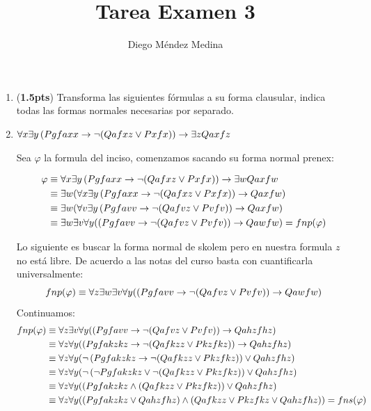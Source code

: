 \documentclass[11pt,letterpaper]{article}
\title{Tarea Examen 3}
\author{Diego Méndez Medina}
\date{}
\begin{document}
\maketitle

\thispagestyle{empty}


\begin{enumerate}
\item ({\bf 1.5pts}) Transforma las siguientes fórmulas a su forma clausular, indica todas las formas normales necesarias por separado.

  \be
\item $\forall x\exists y\left(Pgfaxx \to \neg (Qafxz \lor Pxfx) \right) \to \exists z Qaxfz$

  Sea $\varphi$ la formula del inciso,
  comenzamos sacando su forma normal prenex:
  
  \begin{align*}
    \varphi 
    &\equiv
    \forall x\exists y\left(Pgfaxx \to \neg (Qafxz \lor Pxfx) \right) \to \exists w Qaxfw\\
    &\equiv
    \exists w(\forall x\exists y\left(Pgfaxx \to \neg (Qafxz \lor Pxfx) \right) \to Qaxfw)
    \\
    &\equiv
    \exists w(\forall v\exists y\left(Pgfavv \to \neg (Qafvz \lor Pvfv) \right) \to Qaxfw)\\
    &\equiv
    \exists w\exists v\forall y(\left(Pgfavv \to \neg (Qafvz \lor Pvfv) \right) \to Qawfw)
    = fnp(\varphi)
  \end{align*}
  
  Lo siguiente es buscar la forma normal de skolem pero en nuestra formula $z$
  no está libre. De acuerdo a las notas del curso basta con cuantificarla
  universalmente:
  $$fnp(\varphi) \equiv
  \forall z\exists w\exists v\forall y(\left(Pgfavv \to \neg (Qafvz \lor Pvfv) \right) \to Qawfw)
  $$
  Continuamos:
  \begin{align*}
    fnp(\varphi) &\equiv
    \forall z\exists v\forall y(\left(Pgfavv \to \neg (Qafvz \lor Pvfv) \right) \to Qahzfhz)\\
    &\equiv
    \forall z\forall y(\left(Pgfakzkz \to \neg (Qafkzz \lor Pkzfkz) \right) \to Qahzfhz)\\
    &\equiv
    \forall z\forall y(\neg\left(Pgfakzkz \to \neg (Qafkzz \lor Pkzfkz) \right) \lor Qahzfhz)\\    
    &\equiv
    \forall z\forall y(\neg\left(\neg Pgfakzkz \lor \neg (Qafkzz \lor Pkzfkz) \right) \lor Qahzfhz)\\    
    &\equiv
    \forall z\forall y(\left(Pgfakzkz \land (Qafkzz \lor Pkzfkz) \right) \lor Qahzfhz)\\    
    &\equiv
    \forall z\forall y(\left(Pgfakzkz \lor Qahzfhz\right) \land (Qafkzz \lor Pkzfkz\lor Qahzfhz))= fns (\varphi)
  \end{align*}


\end{enumerate}
\end{document}
